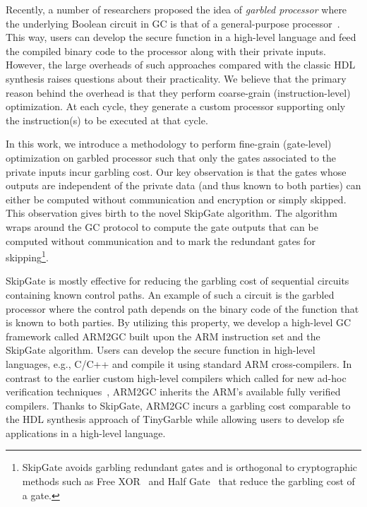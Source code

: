 Recently, a number of researchers proposed the idea of \textit{garbled processor} where the underlying Boolean circuit in GC is that of a general-purpose processor~\cite{wang2016secure, songhori2016garbledcpu}.
This way, users can develop the secure function in a high-level language and feed the compiled binary code to the processor along with their private inputs.
However, the large overheads of such approaches compared with the classic HDL synthesis raises questions about their practicality.
We believe that the primary reason behind the overhead is that they perform coarse-grain (instruction-level) optimization.
At each cycle, they generate a custom processor supporting only the instruction(s) to be executed at that cycle.

In this work, we introduce a methodology to perform fine-grain (gate-level) optimization on garbled processor such that only the gates associated to the private inputs incur garbling cost.
Our key observation is that the gates whose outputs are independent of the private data (and thus known to both parties) can either be computed without communication and encryption or simply skipped.
This observation gives birth to the novel SkipGate algorithm.
The algorithm wraps around the GC protocol to compute the gate outputs that can be computed without communication and to mark the redundant gates for skipping\footnote{SkipGate avoids garbling redundant gates and is orthogonal to cryptographic methods such as Free XOR~\cite{kolesnikov2008improved} and Half Gate~\cite{zahur2015two} that reduce the garbling cost of a gate.}.

SkipGate is mostly effective for reducing the garbling cost of sequential circuits~\cite{songhori2015tinygarble} containing known control paths.
An example of such a circuit is the garbled processor where the control path depends on the binary code of the function that is known to both parties.
By utilizing this property, we develop a high-level GC framework called ARM2GC built upon the ARM instruction set and the SkipGate algorithm.
Users can develop the secure function in high-level languages, e.g., C/C++ and compile it using standard ARM cross-compilers.
In contrast to the earlier custom high-level compilers which called for new ad-hoc verification techniques~\cite{rastogi2014wysteria,demmler2015aby,liu2015oblivm,mood2016frigate}, ARM2GC inherits the ARM's available fully verified compilers.
Thanks to SkipGate, ARM2GC incurs a garbling cost comparable to the HDL synthesis approach of TinyGarble while allowing users to develop \acrshort{sfe} applications in a high-level language.

